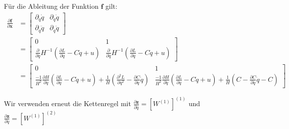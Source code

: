 \documentclass[a4paper, 12pt]{scrartcl}
\begin{document}
Für die Ableitung der Funktion $\bm{f}$ gilt: 
\begin{align*}
    \frac{\partial \bm{f}}{\partial \bm{x}}
    &=
    \begin{bmatrix}
        \partial_{q} \dot{q}
        &
        \partial_{\dot{q}} \dot{q}
        \\
        \partial_{q} \ddot{q}
        &
        \partial_{\dot{q}} \ddot{q}
    \end{bmatrix}
    \\
    &=
    \begin{bmatrix}
        0
        &
        1
        \\
        \frac{\partial}{\partial q}  H^{-1} \left(\frac{\partial L}{\partial q} - C \dot{q} + u\right)
        &
        \frac{\partial}{\partial \dot{q}}  H^{-1} \left(\frac{\partial L}{\partial q} - C \dot{q} + u\right)
    \end{bmatrix}
    \\
    &=
    \begin{bmatrix}
        0
        &
        1
        \\
        \frac{-1}{H^2} \frac{\partial H}{\partial q} 
        \left(
            \frac{\partial L}{\partial q} - C \dot{q} + u
        \right)
        + 
        \frac{1}{H}
        \left(
            \frac{\partial^2 L}{\partial q^2} - \frac{\partial C}{\partial q} \dot{q}
        \right)
        &
        \frac{-1}{H^2} \frac{\partial H}{\partial \dot{q}} 
        \left(
            \frac{\partial L}{\partial q} - C \dot{q} + u
        \right)
        + 
        \frac{1}{H}
        \left(
            C - \frac{\partial C}{\partial \dot{q}} \dot{q}
            - C
        \right)
    \end{bmatrix}
\end{align*}

Wir verwenden erneut die Kettenregel mit $\frac{\partial \bm{z}}{\partial q} = \left[W^{(1)}\right]^{(1)}$ und 
$\frac{\partial \bm{z}}{\partial \dot{q}} = \left[W^{(1)}\right]^{(2)}$
\end{document}
